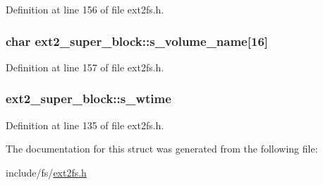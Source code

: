 \-Definition at line 156 of file ext2fs.\-h.

\hypertarget{structext2__super__block_aafa5ddd1cf9fbf19aa2b80e83bff5a43}{
\subsubsection[{s\-\_\-volume\-\_\-name}]{\setlength{\rightskip}{0pt plus 5cm}char {\bf ext2\-\_\-super\-\_\-block\-::s\-\_\-volume\-\_\-name}\mbox{[}16\mbox{]}}}\label{structext2__super__block_aafa5ddd1cf9fbf19aa2b80e83bff5a43}


\-Definition at line 157 of file ext2fs.\-h.

\hypertarget{structext2__super__block_a97c255a8e87dbea1ab953b0a8fce054d}{
\subsubsection[{s\-\_\-wtime}]{ {\bf ext2\-\_\-super\-\_\-block\-::s\-\_\-wtime}}}\label{structext2__super__block_a97c255a8e87dbea1ab953b0a8fce054d}


\-Definition at line 135 of file ext2fs.\-h.



\-The documentation for this struct was generated from the following file\-:\begin{DoxyCompactItemize}
\item 
include/fs/\hyperlink{ext2fs_8h}{ext2fs.\-h}\end{DoxyCompactItemize}
